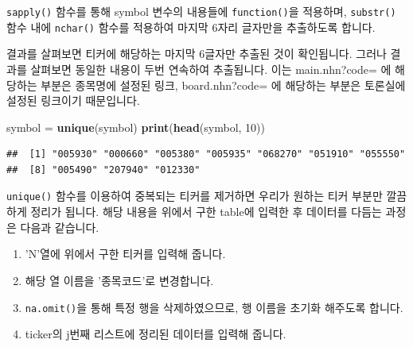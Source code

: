 \documentclass[]{book}
\newenvironment{Shaded}{\begin{snugshade}}{\end{snugshade}}
\newcommand{\DecValTok}[1]{\textcolor[rgb]{0.00,0.00,0.81}{#1}}
\newcommand{\KeywordTok}[1]{\textcolor[rgb]{0.13,0.29,0.53}{\textbf{#1}}}
\newcommand{\NormalTok}[1]{#1}
\newcommand{\OperatorTok}[1]{\textcolor[rgb]{0.81,0.36,0.00}{\textbf{#1}}}
\newcommand{\OtherTok}[1]{\textcolor[rgb]{0.56,0.35,0.01}{#1}}
\newcommand{\StringTok}[1]{\textcolor[rgb]{0.31,0.60,0.02}{#1}}
\providecommand{\tightlist}{%
  \setlength{\itemsep}{0pt}\setlength{\parskip}{0pt}}
\begin{document}
\texttt{sapply()} 함수를 통해 symbol 변수의 내용들에 \texttt{function()}을 적용하며, \texttt{substr()} 함수 내에 \texttt{nchar()} 함수를 적용하여 마지막 6자리 글자만을 추출하도록 합니다.

결과를 살펴보면 티커에 해당하는 마지막 6글자만 추출된 것이 확인됩니다. 그러나 결과를 살펴보면 동일한 내용이 두번 연속하여 추출됩니다. 이는 main.nhn?code= 에 해당하는 부분은 종목명에 설정된 링크, board.nhn?code= 에 해당하는 부분은 토론실에 설정된 링크이기 때문입니다.

\begin{Shaded}
\begin{Highlighting}[]
\NormalTok{symbol =}\StringTok{ }\KeywordTok{unique}\NormalTok{(symbol)}
\KeywordTok{print}\NormalTok{(}\KeywordTok{head}\NormalTok{(symbol, }\DecValTok{10}\NormalTok{))}
\end{Highlighting}
\end{Shaded}

\begin{verbatim}
##  [1] "005930" "000660" "005380" "005935" "068270" "051910" "055550"
##  [8] "005490" "207940" "012330"
\end{verbatim}

\texttt{unique()} 함수를 이용하여 중복되는 티커를 제거하면 우리가 원하는 티커 부분만 깔끔하게 정리가 됩니다. 해당 내용을 위에서 구한 table에 입력한 후 데이터를 다듬는 과정은 다음과 같습니다.

\begin{Shaded}
\end{Shaded}

\begin{enumerate}
\def\labelenumi{\arabic{enumi}.}
\tightlist
\item
  'N'열에 위에서 구한 티커를 입력해 줍니다.
\item
  해당 열 이름을 '종목코드'로 변경합니다.
\item
  \texttt{na.omit()}을 통해 특정 행을 삭제하였으므로, 행 이름을 초기화 해주도록 합니다.
\item
  ticker의 j번째 리스트에 정리된 데이터를 입력해 줍니다.
\end{enumerate}
\end{document}
